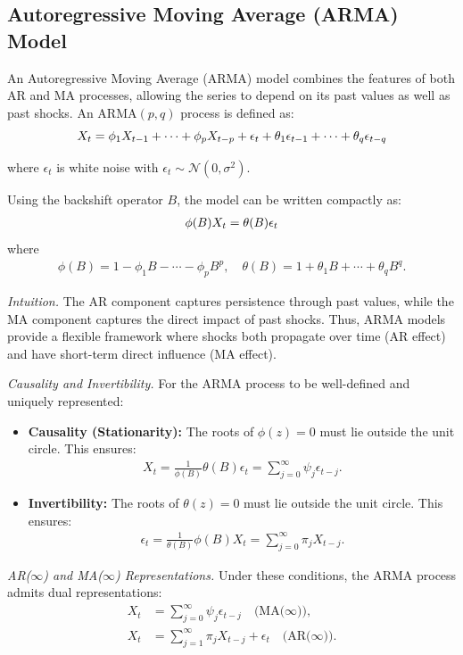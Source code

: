 \documentclass[10pt,a4paper]{article}
\begin{document}
	
	
	\subsection{Autoregressive Moving Average (ARMA) Model}
	
	An Autoregressive Moving Average (ARMA) model combines the features of both AR and MA processes, allowing the series to depend on its past values as well as past shocks. An ARMA$(p,q)$ process is defined as:
	\[
	\large X_t = \phi_1 X_{t-1} + \cdots + \phi_p X_{t-p} + \epsilon_t + \theta_1 \epsilon_{t-1} + \cdots + \theta_q \epsilon_{t-q}
	\]
	
	where ${\epsilon_t}$ is white noise with $\epsilon_t \sim \mathcal{N}(0,\sigma^2)$.
	
	Using the backshift operator $B$, the model can be written compactly as:
	\begin{align*}
	\large \phi(B)X_t = \theta(B)\epsilon_t
	\end{align*}
	where
	\begin{align*}
	\phi(B) = 1 - \phi_1 B - \cdots - \phi_p B^p, \quad
	\theta(B) = 1 + \theta_1 B + \cdots + \theta_q B^q.
	\end{align*}
	
	\textit{Intuition.} The AR component captures persistence through past values, while the MA component captures the direct impact of past shocks. Thus, ARMA models provide a flexible framework where shocks both propagate over time (AR effect) and have short-term direct influence (MA effect).
	
	\textit{Causality and Invertibility.} For the ARMA process to be well-defined and uniquely represented:
	\begin{itemize}
	\item \textbf{Causality (Stationarity):} The roots of $\phi(z)=0$ must lie outside the unit circle. This ensures:
	\begin{align*}
	X_t = \frac{1}{\phi(B)}\theta(B)\epsilon_t = \sum_{j=0}^{\infty} \psi_j \epsilon_{t-j}.
	\end{align*}
	\item \textbf{Invertibility:} The roots of $\theta(z)=0$ must lie outside the unit circle. This ensures:
	\begin{align*}
	\epsilon_t = \frac{1}{\theta(B)}\phi(B)X_t = \sum_{j=0}^{\infty} \pi_j X_{t-j}.
	\end{align*}
	\end{itemize}
	
	\textit{AR($\infty$) and MA($\infty$) Representations.} Under these conditions, the ARMA process admits dual representations:
	\begin{align*}
	X_t &= \sum_{j=0}^{\infty} \psi_j \epsilon_{t-j} \quad \text{(MA($\infty$))}, \\
	X_t &= \sum_{j=1}^{\infty} \pi_j X_{t-j} + \epsilon_t \quad \text{(AR($\infty$))}.
	\end{align*}
	
\end{document}
